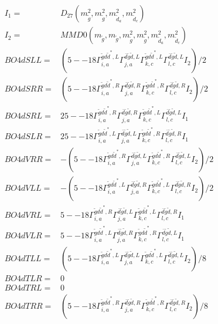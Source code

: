 \documentclass[A4,landscape]{article}
\begin{document}
\begin{align} 
I_1 = & D_{27}(m^2_{\tilde{g}}, m^2_{\tilde{g}}, m^2_{\tilde{d}_{{a}}}, m^2_{\tilde{d}_{{c}}}) \\ 
I_2 = & MMD0(m_{\tilde{g}}, m_{\tilde{g}}, m^2_{\tilde{g}}, m^2_{\tilde{g}}, m^2_{\tilde{d}_{{a}}}, m^2_{\tilde{d}_{{c}}}) \\ 
  BO4dSLL= & (5
--
18 \Gamma^{\tilde{g} d \tilde{d}^*,L}_{i, a} \Gamma^{\bar{d}\tilde{g} \tilde{d} ,L}_{j, a} \Gamma^{\tilde{g} d \tilde{d}^*,L}_{k, c} \Gamma^{\bar{d}\tilde{g} \tilde{d} ,L}_{l, c} I_2)/2 \\ 
  BO4dSRR= & (5
--
18 \Gamma^{\tilde{g} d \tilde{d}^*,R}_{i, a} \Gamma^{\bar{d}\tilde{g} \tilde{d} ,R}_{j, a} \Gamma^{\tilde{g} d \tilde{d}^*,R}_{k, c} \Gamma^{\bar{d}\tilde{g} \tilde{d} ,R}_{l, c} I_2)/2 \\ 
  BO4dSRL= & 2 5
--
18 \Gamma^{\tilde{g} d \tilde{d}^*,R}_{i, a} \Gamma^{\bar{d}\tilde{g} \tilde{d} ,R}_{j, a} \Gamma^{\tilde{g} d \tilde{d}^*,L}_{k, c} \Gamma^{\bar{d}\tilde{g} \tilde{d} ,L}_{l, c} I_1 \\ 
  BO4dSLR= & 2 5
--
18 \Gamma^{\tilde{g} d \tilde{d}^*,L}_{i, a} \Gamma^{\bar{d}\tilde{g} \tilde{d} ,L}_{j, a} \Gamma^{\tilde{g} d \tilde{d}^*,R}_{k, c} \Gamma^{\bar{d}\tilde{g} \tilde{d} ,R}_{l, c} I_1 \\ 
  BO4dVRR= & -(5
--
18 \Gamma^{\tilde{g} d \tilde{d}^*,R}_{i, a} \Gamma^{\bar{d}\tilde{g} \tilde{d} ,L}_{j, a} \Gamma^{\tilde{g} d \tilde{d}^*,R}_{k, c} \Gamma^{\bar{d}\tilde{g} \tilde{d} ,L}_{l, c} I_2)/2 \\ 
  BO4dVLL= & -(5
--
18 \Gamma^{\tilde{g} d \tilde{d}^*,L}_{i, a} \Gamma^{\bar{d}\tilde{g} \tilde{d} ,R}_{j, a} \Gamma^{\tilde{g} d \tilde{d}^*,L}_{k, c} \Gamma^{\bar{d}\tilde{g} \tilde{d} ,R}_{l, c} I_2)/2 \\ 
  BO4dVRL= & 5
--
18 \Gamma^{\tilde{g} d \tilde{d}^*,R}_{i, a} \Gamma^{\bar{d}\tilde{g} \tilde{d} ,L}_{j, a} \Gamma^{\tilde{g} d \tilde{d}^*,L}_{k, c} \Gamma^{\bar{d}\tilde{g} \tilde{d} ,R}_{l, c} I_1 \\ 
  BO4dVLR= & 5
--
18 \Gamma^{\tilde{g} d \tilde{d}^*,L}_{i, a} \Gamma^{\bar{d}\tilde{g} \tilde{d} ,R}_{j, a} \Gamma^{\tilde{g} d \tilde{d}^*,R}_{k, c} \Gamma^{\bar{d}\tilde{g} \tilde{d} ,L}_{l, c} I_1 \\ 
  BO4dTLL= & (5
--
18 \Gamma^{\tilde{g} d \tilde{d}^*,L}_{i, a} \Gamma^{\bar{d}\tilde{g} \tilde{d} ,L}_{j, a} \Gamma^{\tilde{g} d \tilde{d}^*,L}_{k, c} \Gamma^{\bar{d}\tilde{g} \tilde{d} ,L}_{l, c} I_2)/8 \\ 
  BO4dTLR= & 0 \\ 
  BO4dTRL= & 0 \\ 
  BO4dTRR= & (5
--
18 \Gamma^{\tilde{g} d \tilde{d}^*,R}_{i, a} \Gamma^{\bar{d}\tilde{g} \tilde{d} ,R}_{j, a} \Gamma^{\tilde{g} d \tilde{d}^*,R}_{k, c} \Gamma^{\bar{d}\tilde{g} \tilde{d} ,R}_{l, c} I_2)/8 \\ 
\end{align} 
\end{document}
